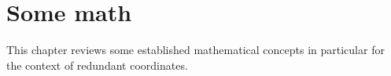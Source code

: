 \chapter{Some math}\label{chap:Math}
This chapter reviews some established mathematical concepts in particular for the context of redundant coordinates.